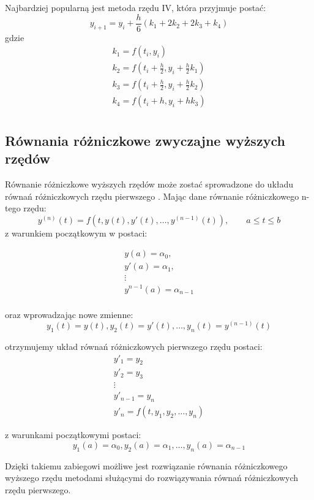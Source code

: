 Najbardziej popularną jest metoda rzędu IV, która przyjmuje postać:
\begin{equation}
	y_{i+1} = y_i + \frac{h}{6}(k_1 + 2k_2 + 2k_3 + k_4)
\end{equation}
gdzie
$$\begin{array}{c}
	k_1 = f(t_i,y_i) \\
	k_2 = f(t_i + \frac{h}{2}, y_i + \frac{h}{2}k_1) \\
	k_3 = f(t_i + \frac{h}{2}, y_i + \frac{h}{2}k_2) \\
	k_4 = f(t_i + h,y_i + hk_3) \\
\end{array}$$

\subsection*{Równania różniczkowe zwyczajne wyższych rzędów}
Równanie różniczkowe wyższych rzędów może zostać sprowadzone do układu równań różniczkowych rzędu pierwszego \cite[str. 293]{AK_RBG2002}. Mając dane równanie różniczkowego n-tego rzędu:
$$y^{(n)}(t) = f(t,y(t),y'(t),\hdots,y^{(n-1)}(t)), \qquad a \leq t \leq b$$
z warunkiem początkowym w postaci:

$$\begin{array}{c}
y(a)       = \alpha_0,    \\
y'(a)      = \alpha_1,    \\
\vdots					  \\
y^{n-1}(a) = \alpha_{n-1} \\
\end{array}$$

oraz wprowadzając nowe zmienne:
$$y_1(t) = y(t), y_2(t) = y'(t), \hdots, y_n(t) = y^{(n-1)}(t)$$

otrzymujemy układ równań różniczkowych pierwszego rzędu postaci:
$$\begin{array}{l}
y'_1       = y_2   \\
y'_2       = y_3   \\
\vdots			   \\
y'_{n-1} = y_n     \\
y'_n = f(t,y_1,y_2,\hdots,y_n)
\end{array}$$

z warunkami początkowymi postaci:
$$y_1(a) = \alpha_0, y_2(a) = \alpha_1, \hdots, y_n(a) = \alpha_{n-1}$$

Dzięki takiemu zabiegowi możliwe jest rozwiązanie równania różniczkowego wyższego rzędu metodami służącymi do rozwiązywania równań różniczkowych rzędu pierwszego.

